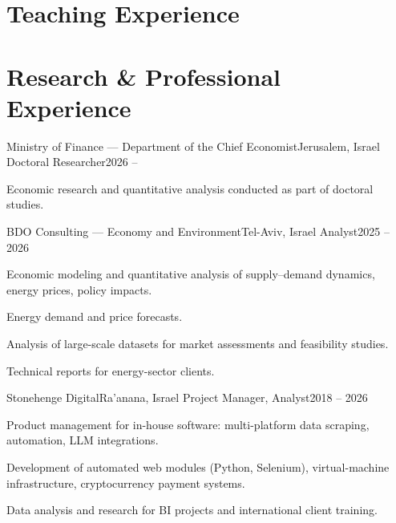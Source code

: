\documentclass[a4paper, 10pt]{article}
\begin{document}
\section{Teaching Experience}

\section{Research \& Professional Experience}
\cventry
{Ministry of Finance --- Department of the Chief Economist}{Jerusalem, Israel}
{Doctoral Researcher}{2026 -- }
\cvItems
\item Economic research and quantitative analysis conducted as part of doctoral studies.
\cvItemsEnd

\cventry
{BDO Consulting --- Economy and Environment}{Tel-Aviv, Israel}
{Analyst}{2025 -- 2026}
\cvItems
\item Economic modeling and quantitative analysis of supply--demand dynamics, energy prices, policy impacts.
\item Energy demand and price forecasts.
\item Analysis of large-scale datasets for market assessments and feasibility studies.
\item Technical reports for energy-sector clients.
\cvItemsEnd

\cventry
{Stonehenge Digital}{Ra'anana, Israel}
{Project Manager, Analyst}{2018 -- 2026}
\cvItems
\item Product management for in-house software: multi-platform data scraping, automation, LLM integrations.
\item Development of automated web modules (Python, Selenium), virtual-machine infrastructure, cryptocurrency payment systems.
\item Data analysis and research for BI projects and international client training.
\cvItemsEnd
\end{document}
